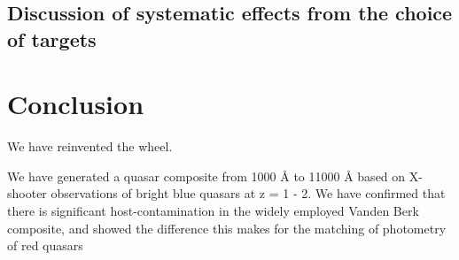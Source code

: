 \documentclass[iop]{emulateapj}
\begin{document}
\subsection{Discussion of systematic effects from the choice of targets}




\section{Conclusion}
We have reinvented the wheel.

We have generated a quasar composite from 1000 \r{A} to 11000 \r{A} based on X-shooter observations of bright blue quasars at z = 1 - 2. We have confirmed that there is significant host-contamination in the widely employed Vanden Berk composite, and showed the difference this makes for the matching of photometry of red quasars


%
%
%
%

\end{document}
